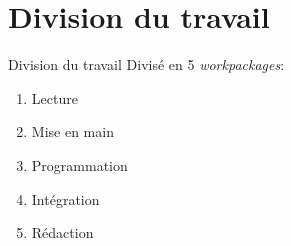 \section{Division du travail}
\begin{frame}{Division du travail}
	Divisé en 5 \textit{workpackages}:\pause
	\begin{enumerate}
		\item Lecture\pause
		\item Mise en main\pause \only<7>{ $ \leftarrow $}
		\item Programmation\pause \only<7>{ $ \leftarrow $}
		\item Intégration\pause \only<7>{ $ \leftarrow $}
		\item Rédaction
	\end{enumerate}
\end{frame}